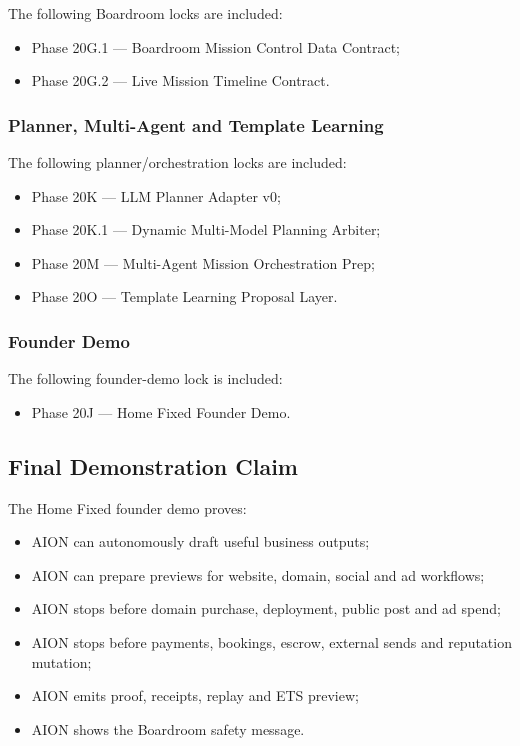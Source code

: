 The following Boardroom locks are included:

\begin{itemize}
  \item Phase 20G.1 --- Boardroom Mission Control Data Contract;
  \item Phase 20G.2 --- Live Mission Timeline Contract.
\end{itemize}

\subsubsection{Planner, Multi-Agent and Template Learning}

The following planner/orchestration locks are included:

\begin{itemize}
  \item Phase 20K --- LLM Planner Adapter v0;
  \item Phase 20K.1 --- Dynamic Multi-Model Planning Arbiter;
  \item Phase 20M --- Multi-Agent Mission Orchestration Prep;
  \item Phase 20O --- Template Learning Proposal Layer.
\end{itemize}

\subsubsection{Founder Demo}

The following founder-demo lock is included:

\begin{itemize}
  \item Phase 20J --- Home Fixed Founder Demo.
\end{itemize}

\subsection{Final Demonstration Claim}

The Home Fixed founder demo proves:

\begin{itemize}
  \item AION can autonomously draft useful business outputs;
  \item AION can prepare previews for website, domain, social and ad workflows;
  \item AION stops before domain purchase, deployment, public post and ad spend;
  \item AION stops before payments, bookings, escrow, external sends and reputation mutation;
  \item AION emits proof, receipts, replay and ETS preview;
  \item AION shows the Boardroom safety message.
\end{itemize}

